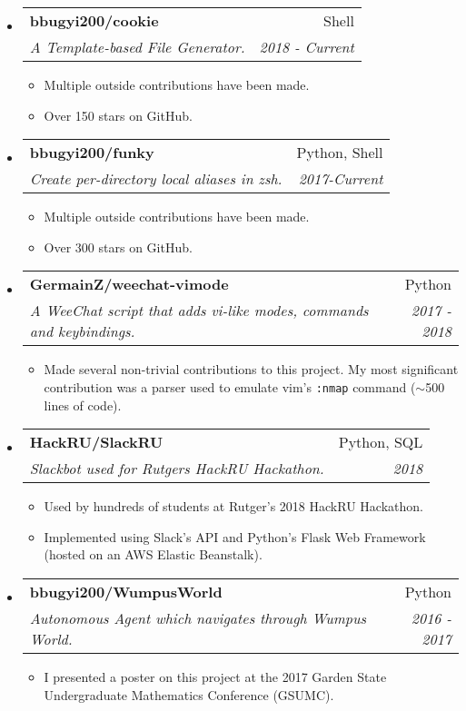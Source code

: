 \documentclass[letterpaper,11pt]{article}
\makeatletter
\newcommand{\ressubheading}[4]{
\begin{tabular*}{6.5in}{l@{\cftdotfill{\cftsecdotsep}\extracolsep{\fill}}r}
		\textbf{#1} & #2 \\
		\textit{#3} & \textit{#4} \\
\end{tabular*}\vspace{-6pt}}
\makeatother
\begin{document}
\begin{itemize}
\item \ressubheading{bbugyi200/cookie}{Shell}{A Template-based File Generator.}{2018 - Current}
    \begin{itemize}
        \item
            Multiple outside contributions have been made.
        \item
            Over 150 stars on GitHub.
    \end{itemize}
\item \ressubheading{bbugyi200/funky}{Python, Shell}{Create per-directory local aliases in zsh.}{2017-Current}
    \begin{itemize}
        \item
            Multiple outside contributions have been made.
        \item
            Over 300 stars on GitHub.
    \end{itemize}
\item \ressubheading{GermainZ/weechat-vimode}{Python}{A WeeChat script that adds vi-like modes, commands and keybindings.}{2017 - 2018}
    \begin{itemize}
        \item
            Made several non-trivial contributions to this project. My most significant contribution was a parser used to emulate vim's \texttt{:nmap} command ($\sim$500 lines of code).
    \end{itemize}
\item \ressubheading{HackRU/SlackRU}{Python, SQL}{Slackbot used for Rutgers HackRU Hackathon.}{2018}
    \begin{itemize}
        \item
            Used by hundreds of students at Rutger's 2018 HackRU Hackathon.
        \item
            Implemented using Slack's API and Python's Flask Web Framework (hosted on an AWS Elastic Beanstalk).
    \end{itemize}
\item \ressubheading{bbugyi200/WumpusWorld}{Python}{Autonomous Agent which navigates through Wumpus World.}{2016 - 2017}
    \begin{itemize}
        \item
            I presented a poster on this project at the 2017 Garden State Undergraduate Mathematics Conference (GSUMC).
    \end{itemize}
\end{itemize}
\end{document}
